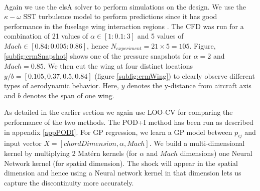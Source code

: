 Again we use the elsA\textsuperscript{\textregistered} solver to perform simulations on the design. We use the $\kappa - \omega$ SST turbulence model to perform predictions since it has good performance in the fuselage wing interaction regions \cite{menter2003ten, vassberg2014summary}. The CFD was run for a combination of 21 values of $\alpha \in [1: 0.1: 3]$ and 5 values of $Mach \in [0.84: 0.005: 0.86]$, hence $N_{experiment} = 21\times5 = 105$. Figure, \ref{subfig:crmSnapshot} shows one of the pressure snapshots for $\alpha = 2$ and $Mach = 0.85$. We then cut the wing at four distinct locations $y/b = [0.105, 0.37, 0.5, 0.84]$ (figure \ref{subfig:crmWing}) to clearly observe different types of aerodynamic behavior. Here, $y$ denotes the y-distance from aircraft axis and $b$ denotes the span of one wing. 

As detailed in the earlier section we again use LOO-CV for comparing the performance of the two methods. The POD+I method has been run as described in appendix \ref{appPODI}. For GP regression, we learn a GP model between $p_{ij}$ and input vector $X = [chordDimension, \alpha, Mach]$. We build a multi-dimensional kernel by multiplying 2 Mat\'ern kernels (for $\alpha$ and $Mach$ dimensions) one Neural Network kernel (for spatial dimension). The shock will appear in the spatial dimension and hence using a Neural network kernel in that dimension lets us capture the discontinuity more accurately. 

